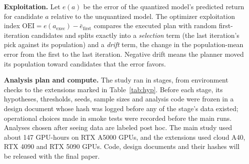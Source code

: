 \documentclass[conference]{IEEEtran}
\begin{document}
\textbf{Exploitation.} Let $e(a)$ be the error of the quantized model's predicted return for candidate $a$ relative to the unquantized model. The optimizer exploitation index $\mathrm{OEI}=e(a_{\mathrm{exec}})-\bar e_{\mathrm{first}}$ compares the executed plan with random first-iteration candidates and splits exactly into a \emph{selection} term (the last iteration's pick against its population) and a \emph{drift} term, the change in the population-mean error from the first to the last iteration. Negative drift means the planner moved its population toward candidates that the error favors.

\textbf{Analysis plan and compute.} The study ran in stages, from environment checks to the extensions marked in Table~\ref{tab:hyp}. Before each stage, its hypotheses, thresholds, seeds, sample sizes and analysis code were frozen in a design document whose hash was logged before any of the stage's data existed; operational choices made in smoke tests were recorded before the main runs. Analyses chosen after seeing data are labeled post hoc. The main study used about 147 GPU-hours on RTX A5000 GPUs, and the extensions used cloud A40, RTX 4090 and RTX 5090 GPUs. Code, design documents and their hashes will be released with the final paper.
\end{document}
